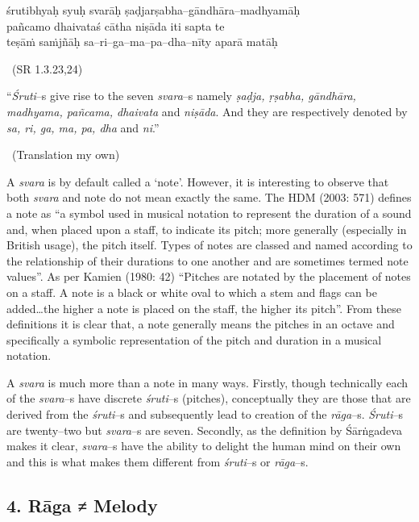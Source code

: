 \begin{myquote}
śrutibhyaḥ syuḥ svarāḥ ṣaḍjarṣabha–gāndhāra–madhyamāḥ \\ pañcamo dhaivataś cātha niṣāda iti sapta te \\ teṣāṁ saṁjñāḥ sa–ri–ga–ma–pa–dha–nīty aparā matāḥ  

~\hfill (SR 1.3.23,24)
\end{myquote}

\begin{myquote}
“\textit{Śruti}–s give rise to the seven \textit{svara}–s namely \textit{ṣaḍja, ṛṣabha, gāndhāra, madhyama, pañcama, dhaivata} and \textit{niṣāda}. And they are respectively denoted by \textit{sa, ri, ga, ma, pa, dha} and \textit{ni}.” 

~\hfill (Translation my own)
\end{myquote}

A \textit{svara} is by default called a ‘note’. However, it is interesting to observe that both \textit{svara} and note do not mean exactly the same. The HDM (2003: 571) defines a note as “a symbol used in musical notation to represent the duration of a sound and, when placed upon a staff, to indicate its pitch; more generally (especially in British usage), the pitch itself. Types of notes are classed and named according to the relationship of their durations to one another and are sometimes termed note values”. As per Kamien (1980: 42) “Pitches are notated by the placement of notes on a staff. A note is a black or white oval to which a stem and flags can be added…the higher a note is placed on the staff, the higher its pitch”. From these definitions it is clear that, a note generally means the pitches in an octave and specifically a symbolic representation of the pitch and duration in a musical notation. 

A \textit{svara} is much more than a note in many ways. Firstly, though technically each of the \textit{svara}–s have discrete \textit{śruti}–s (pitches), conceptually they are those that are derived from the \textit{śruti}–s and subsequently lead to creation of the \textit{rāga}–s. \textit{Śruti}–s are twenty–two but \textit{svara}–s are seven. Secondly, as the definition by Śārṅgadeva makes it clear, \textit{svara}–s have the ability to delight the human mind on their own and this is what makes them different from \textit{śruti}–s or \textit{rāga}–s.


\subsection*{4. Rāga ≠ Melody}

